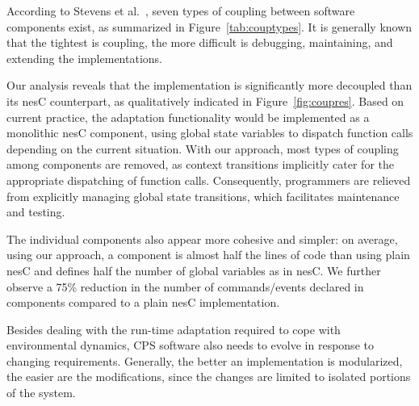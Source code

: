  According to Stevens et
al.~\cite{}, seven types of coupling between software components
exist, as summarized in Figure~\ref{tab:couptypes}. It is generally
known that the tightest is coupling, the more difficult is debugging,
maintaining, and extending the implementations.

Our analysis reveals that the \conesc implementation is significantly
more decoupled than its nesC counterpart, as qualitatively indicated
in Figure~\ref{fig:coupres}. Based on current practice, the adaptation
functionality would be implemented as a monolithic nesC component,
using global state variables to dispatch function calls depending on
the current situation. With our approach, most types of coupling among
components are removed, as context transitions implicitly cater for
the appropriate dispatching of function calls. Consequently,
programmers are relieved from explicitly managing global state
transitions, which facilitates maintenance and testing.

The individual \conesc components also appear more
cohesive and simpler: on average, using our approach, a component is
almost half the lines of code than using plain nesC and defines half
the number of global variables as in nesC. We further observe a 75\%
reduction in the number of commands/events declared in \conesc
components compared to a plain nesC implementation.



 Besides dealing with the run-time
adaptation required to cope with environmental dynamics, CPS software
also needs to evolve in response to changing requirements. Generally,
the better an implementation is modularized, the easier are the
modifications, since the changes are limited to isolated portions of
the system.

